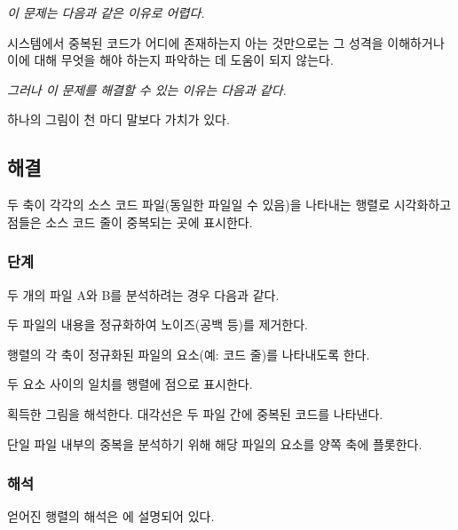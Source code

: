 \documentclass[a4paper,10pt,twoside]{book}
\begin{document}
\emph{이 문제는 다음과 같은 이유로 어렵다.} 

\begin{bulletlist}
\item 시스템에서 중복된 코드가 어디에 존재하는지 아는 것만으로는 그 성격을 이해하거나 이에 대해 무엇을 해야 하는지 파악하는 데 도움이 되지 않는다.
\end{bulletlist}

\emph{그러나 이 문제를 해결할 수 있는 이유는 다음과 같다.}

\begin{bulletlist}
\item 하나의 그림이 천 마디 말보다 가치가 있다.
\end{bulletlist}

\subsection*{해결}

두 축이 각각의 소스 코드 파일(동일한 파일일 수 있음)을 나타내는 행렬로 시각화하고 점들은 소스 코드 줄이 중복되는 곳에 표시한다.

\subsubsection*{단계}

두 개의 파일 A와 B를 분석하려는 경우 다음과 같다.

\begin{bulletlist}
\item 두 파일의 내용을 정규화하여 노이즈(공백 등)를 제거한다.

\item 행렬의 각 축이 정규화된 파일의 요소(예: 코드 줄)를 나타내도록 한다.

\item 두 요소 사이의 일치를 행렬에 점으로 표시한다.

\item 획득한 그림을 해석한다. 대각선은 두 파일 간에 중복된 코드를 나타낸다.
\end{bulletlist}

단일 파일 내부의 중복을 분석하기 위해 해당 파일의 요소를 양쪽 축에 플롯한다.

\subsubsection*{해석}

얻어진 행렬의 해석은 에 설명되어 있다.
\end{document}
